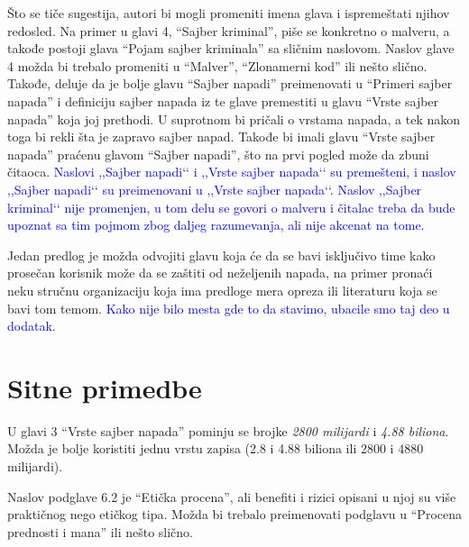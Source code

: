 \documentclass[a4paper]{report}
\newcommand{\odgovor}[1]{\textcolor{blue}{#1}}
\begin{document}
Što se tiče sugestija, autori bi mogli promeniti imena glava i ispremeštati njihov redosled. Na primer u glavi 4, ``Sajber kriminal'', piše se konkretno o malveru, a takođe postoji glava ``Pojam sajber kriminala'' sa sličnim naslovom. Naslov glave 4 možda bi trebalo promeniti u ``Malver'', ``Zlonamerni kod'' ili nešto slično. Takođe, deluje da je bolje glavu ``Sajber napadi'' preimenovati u ``Primeri sajber napada'' i definiciju sajber napada iz te glave premestiti u glavu ``Vrste sajber napada'' koja joj prethodi. U suprotnom bi pričali o vrstama napada, a tek nakon toga bi rekli šta je zapravo sajber napad. Takođe bi imali glavu ``Vrste sajber napada'' praćenu glavom ``Sajber napadi'', što na prvi pogled može da zbuni čitaoca.
\odgovor{Naslovi ,,Sajber napadi‘‘ i ,,Vrste sajber napada‘‘ su premešteni, i naslov ,,Sajber napadi‘‘ su preimenovani u ,,Vrste sajber napada‘‘. Naslov ,,Sajber kriminal‘‘ nije promenjen, u tom delu se govori o malveru i čitalac treba da bude upoznat sa tim pojmom zbog daljeg razumevanja, ali nije akcenat na tome.}

Jedan predlog je možda odvojiti glavu koja će da se bavi isključivo time kako prosečan korisnik može da se zaštiti od neželjenih napada, na primer pronaći neku stručnu organizaciju koja ima predloge mera opreza ili literaturu koja se bavi tom temom.
\odgovor{Kako nije bilo mesta gde to da stavimo, ubacile smo taj deo u dodatak.}


\section{Sitne primedbe}
U glavi 3 ``Vrste sajber napada'' pominju se brojke \textit{2800 milijardi} i \textit{4.88 biliona}. Možda je bolje koristiti jednu vrstu zapisa (2.8 i 4.88 biliona ili 2800 i 4880 milijardi).

Naslov podglave 6.2 je ``Etička procena'', ali benefiti i rizici opisani u njoj su više praktičnog nego etičkog tipa. Možda bi trebalo preimenovati podglavu u ``Procena prednosti i mana'' ili nešto slično.\\
\end{document}
